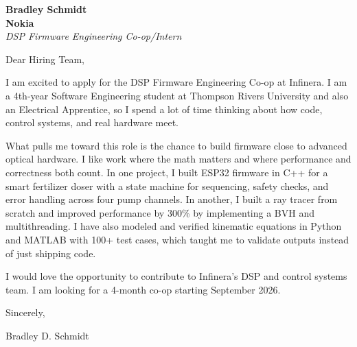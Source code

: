 \documentclass[11pt]{article}
\begin{document}
\textbf{Bradley Schmidt}\\
\vspace{0.5em}
\textbf{Nokia}\\
\textit{DSP Firmware Engineering Co-op/Intern}

Dear Hiring Team,

\par

I am excited to apply for the DSP Firmware Engineering Co-op at Infinera. I am a 4th-year Software Engineering student at Thompson Rivers University and also an Electrical Apprentice, so I spend a lot of time thinking about how code, control systems, and real hardware meet.

\par

What pulls me toward this role is the chance to build firmware close to advanced optical hardware. I like work where the math matters and where performance and correctness both count. In one project, I built ESP32 firmware in C++ for a smart fertilizer doser with a state machine for sequencing, safety checks, and error handling across four pump channels. In another, I built a ray tracer from scratch and improved performance by 300\% by implementing a BVH and multithreading. I have also modeled and verified kinematic equations in Python and MATLAB with 100+ test cases, which taught me to validate outputs instead of just shipping code.

\par

I would love the opportunity to contribute to Infinera’s DSP and control systems team. I am looking for a 4-month co-op starting September 2026.

\par

Sincerely,

\par

Bradley D. Schmidt
\end{document}
